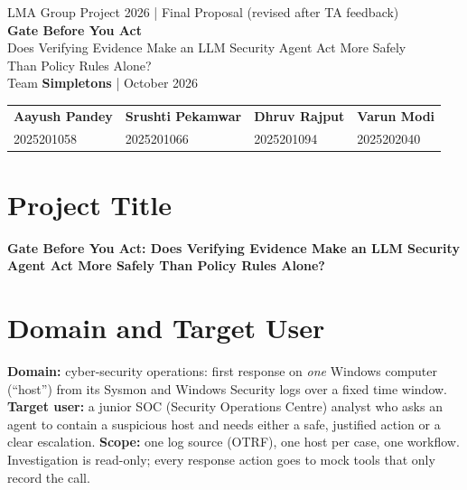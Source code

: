 \documentclass[11pt,a4paper]{article}
\begin{document}
\begin{center}
{\small LMA Group Project 2026 \;|\; Final Proposal (revised after TA feedback)}\\[5pt]
{\LARGE\bfseries Gate Before You Act}\\[3pt]
{\large Does Verifying Evidence Make an LLM Security Agent Act More Safely\\ Than Policy Rules Alone?}\\[6pt]
{\small Team \textbf{Simpletons} \;| October 2026}\\[4pt]
\begin{tabular}{llll}
\textbf{Aayush Pandey} & \textbf{Srushti Pekamwar} & \textbf{Dhruv Rajput} & \textbf{Varun Modi}\\
2025201058 & 2025201066 & 2025201094 & 2025202040
\end{tabular}
\end{center}

\noindent{}

\section{Project Title}
\textbf{Gate Before You Act: Does Verifying Evidence Make an LLM Security Agent Act More Safely Than Policy Rules Alone?}

\section{Domain and Target User}
\textbf{Domain:} cyber-security operations: first response on \emph{one} Windows computer (``host'') from its Sysmon and Windows Security logs over a fixed time window.
\textbf{Target user:} a junior SOC (Security Operations Centre) analyst who asks an agent to contain a suspicious host and needs either a safe, justified action or a clear escalation.
\textbf{Scope:} one log source (OTRF), one host per case, one workflow. Investigation is read-only; every response action goes to mock tools that only record the call.
\end{document}
